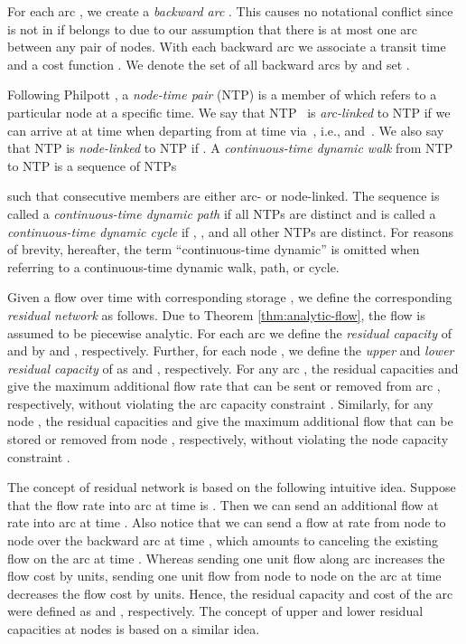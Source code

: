 \documentclass{svjour3}                     \smartqed
\begin{document}
For each arc , we create a \emph{backward arc} . This causes no notational conflict since  is not in  if  belongs to  due to our assumption that  there is at most one arc between any pair of nodes. 
With each backward arc  we associate a transit time~ and a cost function . We denote the set of all backward arcs by  and set
.




Following Philpott \cite{Philpott85}, a \emph{node-time pair} (NTP) is a member of  which refers to a particular node at a specific time. We say that NTP~ is \emph{arc-linked} to NTP  if we can arrive at  at time  when departing from  at time  via~, i.e.,  and~. We also say that NTP  is \emph{node-linked} to NTP  if . 
A \emph{continuous-time dynamic walk} from NTP  to NTP  is a sequence of NTPs

such that consecutive members are either arc- or node-linked. 
The sequence  is called a \emph{continuous-time dynamic path} if all NTPs are distinct and is called a \emph{continuous-time dynamic cycle} if , , and all other NTPs are distinct. For reasons of brevity, hereafter, the term ``continuous-time dynamic'' is omitted when referring to a continuous-time dynamic walk, path, or cycle.

Given a flow over time  with corresponding storage , we define the corresponding \emph{residual network} as follows. Due to Theorem \ref{thm:analytic-flow}, the flow  is assumed to be piecewise analytic.  For each arc  we define the \emph{residual capacity} of  and  by  and , respectively. Further, for each node , we define the \emph{upper} and \emph{lower residual capacity} of  as  and , respectively.  For any arc , the residual capacities  and  give the maximum additional flow rate that can be sent or removed from arc , respectively, without violating the arc capacity constraint .  Similarly, for any node , the residual capacities  and  give the maximum additional flow that can be stored or removed from node , respectively, without violating the node capacity constraint .


The concept of residual network is based on the following intuitive idea. Suppose that the flow rate into arc  at time  is . Then we can send an additional flow at rate  into arc  at time . Also notice that we can send a flow at rate
 from node  to node  over the backward arc  at time , which amounts to
canceling the existing flow on the arc  at time . Whereas sending one unit flow along arc  increases the flow cost by  units, sending one unit flow from node  to
node  on the arc  at time  decreases the flow cost by  units. Hence, the residual capacity and cost of the arc  were defined as  and , respectively. The concept of upper and lower residual capacities at nodes is based on a similar idea.
\end{document}
